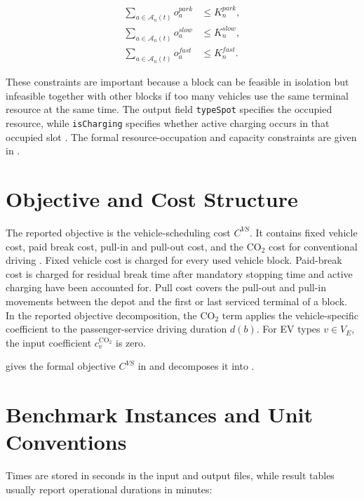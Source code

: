 \begin{align}
\sum_{a\in\mathcal{A}_n(t)}o_a^{park} &\le K_n^{park}, \label{eq:problem-parking-capacity}\\
\sum_{a\in\mathcal{A}_n(t)}o_a^{slow} &\le K_n^{slow}, \label{eq:problem-slow-capacity}\\
\sum_{a\in\mathcal{A}_n(t)}o_a^{fast} &\le K_n^{fast}. \label{eq:problem-fast-capacity}
\end{align}

These constraints are important because a block can be feasible in isolation
but infeasible together with other blocks if too many vehicles use the same
terminal resource at the same time. The output field \texttt{typeSpot}
specifies the occupied resource, while \texttt{isCharging} specifies whether
active charging occurs in that occupied slot \cite{minoa-io}. The formal
resource-occupation and capacity constraints are given in
.

\section{Objective and Cost Structure}

The reported objective is the vehicle-scheduling cost \(C^{VS}\). It contains
fixed vehicle cost, paid break cost, pull-in and pull-out cost, and the
CO\(_2\) cost for conventional driving \cite{minoa-problem}. Fixed vehicle cost is
charged for every used vehicle block. Paid-break cost is charged for residual
break time after mandatory stopping time and active charging have been
accounted for. Pull cost covers the pull-out and pull-in movements between the
depot and the first or last serviced terminal of a block. In the reported
objective decomposition, the CO\(_2\) term applies the vehicle-specific coefficient
to the passenger-service driving duration \(d(b)\). For EV types \(v\in V_E\),
the input coefficient \(c_v^{\mathrm{CO}_2}\) is zero.

 gives the formal objective \(C^{VS}\) in
 and decomposes it into
.

\section{Benchmark Instances and Unit Conventions}

Times are stored in seconds in the input and output files, while result tables
usually report operational durations in minutes:

